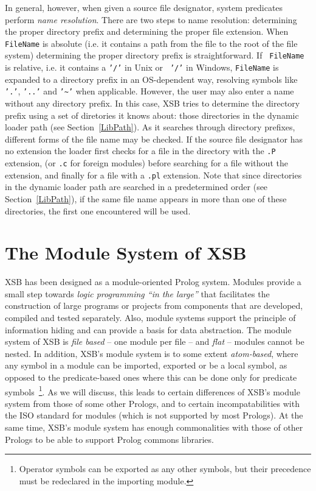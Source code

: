 In general, however, when given a source file designator, system
predicates perform {\em name resolution}.  There are two steps to name
resolution: determining the proper directory prefix and determining
the proper file extension.  When {\tt FileName} is absolute (i.e. it
contains a path from the file to the root of the file system)
determining the proper directory prefix is straightforward.  If {\tt
  FileName} is relative, i.e. it contains a {\tt '/'} in Unix or {\tt
  '/'} in Windows, {\tt FileName} is expanded to a directory prefix in
an OS-dependent way, resolving symbols like {\tt '.'}, {\tt '..'} and
{\tt '\~{}'} when applicable.  However, the user may also enter a name
without any directory prefix. In this case, XSB tries to determine the
directory prefix using a set of diretories it knows about: those
directories in the dynamic loader path (see Section~\ref{LibPath}).
As it searches through directory prefixes, different forms of the file
name may be checked.  If the source file designator has no extension
the loader first checks for a file in the directory with the {\tt .P}
extension, (or {\tt .c} for foreign modules) before searching for a
file without the extension, and finally for a file with a {\tt .pl}
extension.  Note that since directories in the dynamic loader path are
searched in a predetermined order (see Section~\ref{LibPath}), if the
same file name appears in more than one of these directories, the
first one encountered will be used.

\section{The Module System of XSB} \label{Modules}
XSB has been designed as a module-oriented Prolog system.  Modules
provide a small step towards {\em logic programming ``in the large''}
that facilitates the construction of large programs or projects from
components that are developed, compiled and tested separately.  Also,
module systems support the principle of information hiding and can
provide a basis for data abstraction.  The module system of XSB is
{\em file based} -- one module per file -- and {\em flat} -- modules
cannot be nested.  In addition, XSB's module system is to some extent
{\em atom-based}, where any symbol in a module can be imported,
exported or be a local symbol, as opposed to the predicate-based ones
where this can be done only for predicate symbols~\footnote{Operator
  symbols can be exported as any other symbols, but their precedence
  must be redeclared in the importing module.}.  As we will discuss,
this leads to certain differences of XSB's module system from those of
some other Prologs, and to certain incompatabilities with the ISO
standard for modules (which is not supported by most Prologs).  At the
same time, XSB's module system has enough commonalities with those of
other Prologs to be able to support Prolog commons libraries.

